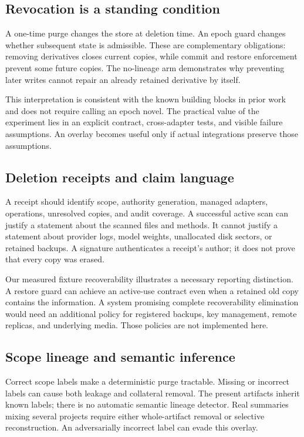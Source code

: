 ﻿\documentclass[sigconf,nonacm]{acmart}
\begin{document}
\subsection{Revocation is a standing condition}
A one-time purge changes the store at deletion time. An epoch guard changes whether subsequent state is admissible. These are complementary obligations: removing derivatives closes current copies, while commit and restore enforcement prevent some future copies. The no-lineage arm demonstrates why preventing later writes cannot repair an already retained derivative by itself.

This interpretation is consistent with the known building blocks in prior work and does not require calling an epoch novel. The practical value of the experiment lies in an explicit contract, cross-adapter tests, and visible failure assumptions. An overlay becomes useful only if actual integrations preserve those assumptions.

\subsection{Deletion receipts and claim language}
A receipt should identify scope, authority generation, managed adapters, operations, unresolved copies, and audit coverage. A successful active scan can justify a statement about the scanned files and methods. It cannot justify a statement about provider logs, model weights, unallocated disk sectors, or retained backups. A signature authenticates a receipt's author; it does not prove that every copy was erased.

Our measured fixture recoverability illustrates a necessary reporting distinction. A restore guard can achieve an active-use contract even when a retained old copy contains the information. A system promising complete recoverability elimination would need an additional policy for registered backups, key management, remote replicas, and underlying media. Those policies are not implemented here.

\subsection{Scope lineage and semantic inference}
Correct scope labels make a deterministic purge tractable. Missing or incorrect labels can cause both leakage and collateral removal. The present artifacts inherit known labels; there is no automatic semantic lineage detector. Real summaries mixing several projects require either whole-artifact removal or selective reconstruction. An adversarially incorrect label can evade this overlay.
\end{document}
